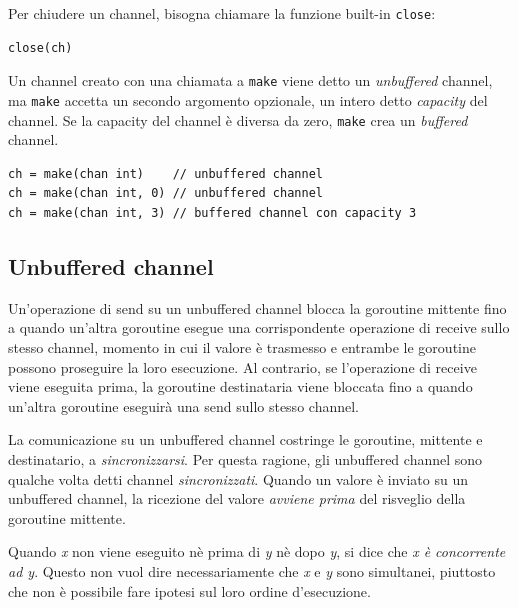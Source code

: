 Per chiudere un channel, bisogna chiamare la funzione built-in \verb|close|:
\begin{lstlisting}[frame=single, label={lst:lstlisting7-4.3}]
close(ch)
\end{lstlisting}
Un channel creato con una chiamata a \verb|make| viene detto un \textit{unbuffered} channel, ma \verb|make| accetta un secondo argomento opzionale, un intero detto \textit{capacity} del channel.
Se la capacity del channel è diversa da zero, \verb|make| crea un \textit{buffered} channel.
\begin{lstlisting}[frame=single, label={lst:lstlisting7-4.4}]
ch = make(chan int)    // unbuffered channel
ch = make(chan int, 0) // unbuffered channel
ch = make(chan int, 3) // buffered channel con capacity 3
\end{lstlisting}

\subsection{Unbuffered channel}
\label{subsec:unbuffered_channel}%
Un'operazione di send su un unbuffered channel blocca la goroutine mittente fino a quando un'altra goroutine esegue una corrispondente operazione di receive sullo stesso channel, momento in cui il valore è trasmesso e entrambe le goroutine possono proseguire la loro esecuzione.
Al contrario, se l'operazione di receive viene eseguita prima, la goroutine destinataria viene bloccata fino a quando un'altra goroutine eseguirà una send sullo stesso channel.

La comunicazione su un unbuffered channel costringe le goroutine, mittente e destinatario, a \textit{sincronizzarsi}.
Per questa ragione, gli unbuffered channel sono qualche volta detti channel \textit{sincronizzati}.
Quando un valore è inviato su un unbuffered channel, la ricezione del valore \textit{avviene prima} del risveglio della goroutine mittente.

Quando \textit{x} non viene eseguito nè prima di \textit{y} nè dopo \textit{y}, si dice che \textit{x è concorrente ad y}.
Questo non vuol dire necessariamente che \textit{x} e \textit{y} sono simultanei, piuttosto che non è possibile fare ipotesi sul loro ordine d'esecuzione.

